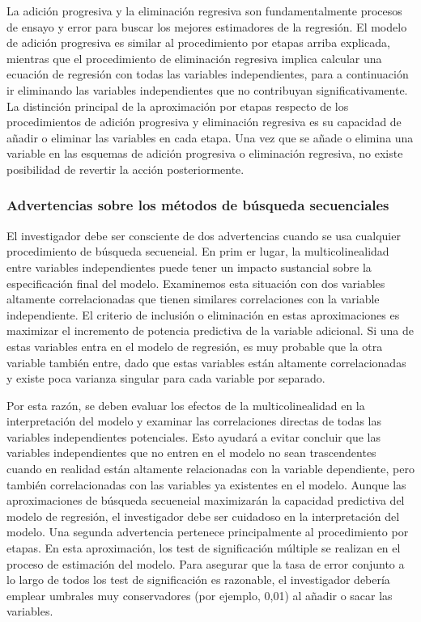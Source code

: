 \documentclass[
  12pt,
]{krantz}
\theoremstyle{definition}
\theoremstyle{definition}
\theoremstyle{definition}
\theoremstyle{remark}
\begin{document}
La adición progresiva y la eliminación regresiva son fundamentalmente procesos de ensayo y error para buscar los mejores estimadores de la regresión. El modelo de adición progresiva es similar al procedimiento por etapas arriba explicada, mientras que el procedimiento de eliminación regresiva implica calcular una ecuación de regresión con todas las variables independientes, para a continuación ir eliminando las variables independientes que no contribuyan significativamente. La distinción principal de la aproximación por etapas respecto de los procedimientos de adición progresiva y eliminación regresiva es su capacidad de añadir o eliminar las variables en cada etapa. Una vez que se añade o elimina una variable en las esquemas de adición progresiva o eliminación regresiva, no existe posibilidad de revertir la acción posteriormente.

\hypertarget{advertencias-sobre-los-metodos-de-busqueda-secuenciales}{%
\subsubsection{Advertencias sobre los métodos de búsqueda secuenciales}\label{advertencias-sobre-los-metodos-de-busqueda-secuenciales}}

El investigador debe ser consciente de dos advertencias cuando se usa cualquier procedimiento de búsqueda secueneial. En prim er lugar, la multicolinealidad entre variables independientes puede tener un impacto sustancial sobre la especificación final del modelo. Examinemos esta situación con dos variables altamente correlacionadas que tienen similares correlaciones con la variable independiente. El criterio de inclusión o eliminación en estas aproximaciones es maximizar el incremento de potencia predictiva de la variable adicional. Si una de estas variables entra en el modelo de regresión, es muy probable que la otra variable también entre, dado que estas variables están altamente correlacionadas y existe poca varianza singular para cada variable por separado.

Por esta razón, se deben evaluar los efectos de la multicolinealidad en la interpretación del modelo y examinar las correlaciones directas de todas las variables independientes potenciales. Esto ayudará a evitar concluir que las variables independientes que no entren en el modelo no sean trascendentes cuando en realidad están altamente relacionadas con la variable dependiente, pero también correlacionadas con las variables ya existentes en el modelo. Aunque las aproximaciones de búsqueda secueneial maximizarán la capacidad predictiva del modelo de regresión, el investigador debe ser cuidadoso en la interpretación del modelo. Una segunda advertencia pertenece principalmente al procedimiento por etapas. En esta aproximación, los test de significación múltiple se realizan en el proceso de estimación del modelo. Para asegurar que la tasa de error conjunto a lo largo de todos los test de significación es razonable, el investigador debería emplear umbrales muy conservadores (por ejemplo, 0,01) al añadir o sacar las variables.
\end{document}
